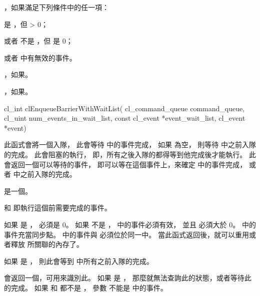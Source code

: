 \startitem
{}，如果滿足下列條件中的任一項：
\startigBase
\item {} 是 ，但  > 0；
\item 或者  不是 ，但  是 0；
\item 或者  中有無效的事件。
\stopigBase
\stopitem

\item {}，如果\scdevfailres。

\item {}，如果\schostfailres。
\stopigBase


\startCLFUNC
cl_int clEnqueueBarrierWithWaitList(
			cl_command_queue command_queue,
			cl_uint num_events_in_wait_list,
			const cl_event *event_wait_list,
			cl_event *event)
\stopCLFUNC

此函式會將一個入隊，
此會等待  中的事件完成，
如果  為空，
則等待  中之前入隊的完成。
此會阻塞的執行，
即，所有之後入隊的都得等到他完成後才能執行。
此會返回一個可以等待的事件，
即可以等在這個事件上，來確定  中的事件完成，
或者  中之前入隊的完成。

 是一個。

 和 
 即執行這個前需要完成的事件。

如果  是 ，
  必須是 0。
如果  不是 ，
  中的事件必須有效，
並且  必須大於 0。
  中的事件充當同步點。
  中的事件與  必須位於同一中。
當此函式返回後，就可以重用或者釋放  所關聯的內存了。

如果  是 ，
則此會等到  中所有之前入隊的完成。

 會返回一個，可用來識別此。
如果  是 ，
那麼就無法查詢此的狀態，或者等待此的完成。
如果  和  都不是 ，
參數  不能是  中的事件。

